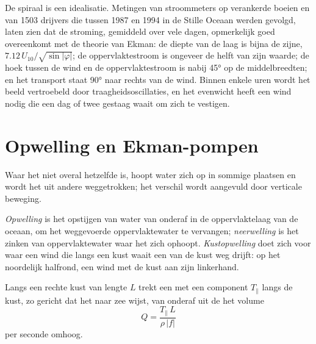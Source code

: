 De spiraal is een idealisatie. Metingen van stroommeters op verankerde boeien en van 1503 drijvers die tussen 1987 en 1994 in de Stille Oceaan werden gevolgd, laten zien dat de stroming, gemiddeld over vele dagen, opmerkelijk goed overeenkomt met de theorie van Ekman: de diepte van de laag is bijna de zijne, $7.12\,U_{10}/\sqrt{\sin|\varphi|}$; de oppervlaktestroom is
ongeveer de helft van zijn waarde; de hoek tussen de wind en de oppervlaktestroom is nabij \ang{45} op de middelbreedten; en het transport staat \ang{90} naar rechts van de wind.
Binnen enkele uren wordt het beeld vertroebeld door traagheidsoscillaties, en het evenwicht heeft een wind nodig die een dag of twee gestaag waait om zich te vestigen.

\section{Opwelling en Ekman-pompen}\label{sec:b1:ocean-circulation:upwelling}

Waar het  niet overal hetzelfde is, hoopt water zich op in sommige plaatsen en wordt het uit andere weggetrokken; het verschil wordt aangevuld door verticale beweging.

\begin{definition}\label{def:b1:ocean-circulation:upwelling}
\emph{Opwelling} is het opstijgen van water van onderaf in de oppervlaktelaag van de oceaan, om het weggevoerde oppervlaktewater te vervangen; \emph{neerwelling}%
 is het zinken van oppervlaktewater waar het zich ophoopt.
\emph{Kustopwelling} doet zich voor waar een wind die langs een kust waait een  van de kust weg drijft: op het noordelijk halfrond,
een wind met de kust aan zijn linkerhand.
\end{definition}

\begin{proposition}[Kustopwelling]\label{prop:b1:ocean-circulation:coastal}
Langs een rechte kust van lengte $L$ trekt een  met een component $T_\parallel$
langs de kust, zo gericht dat het  naar zee wijst, van onderaf uit de  het volume
\[
  Q = \frac{T_\parallel\,L}{\rho\,|f|}
\]
per seconde omhoog.
\end{proposition}

